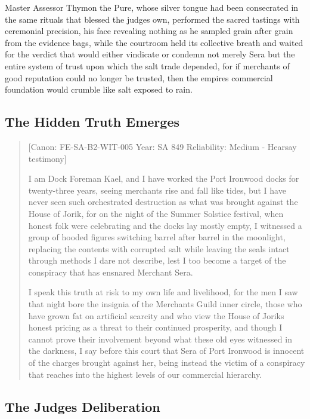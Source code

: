 Master Assessor Thymon the Pure, whose silver tongue had been
consecrated in the same rituals that blessed the judge\textquotesingle s
own, performed the sacred tastings with ceremonial precision, his face
revealing nothing as he sampled grain after grain from the evidence
bags, while the courtroom held its collective breath and waited for the
verdict that would either vindicate or condemn not merely Sera but the
entire system of trust upon which the salt trade depended, for if
merchants of good reputation could no longer be trusted, then the
empire\textquotesingle s commercial foundation would crumble like salt
exposed to rain.

\subsection{The Hidden Truth Emerges}\label{the-hidden-truth-emerges}

\begin{quote}
{[}Canon: FE-SA-B2-WIT-005 \textbar{} Year: SA 849 \textbar{}
Reliability: Medium - Hearsay testimony{]}

I am Dock Foreman Kael, and I have worked the Port Ironwood docks for
twenty-three years, seeing merchants rise and fall like tides, but I
have never seen such orchestrated destruction as what was brought
against the House of Jorik, for on the night of the Summer Solstice
festival, when honest folk were celebrating and the docks lay mostly
empty, I witnessed a group of hooded figures switching barrel after
barrel in the moonlight, replacing the contents with corrupted salt
while leaving the seals intact through methods I dare not describe, lest
I too become a target of the conspiracy that has ensnared Merchant Sera.

I speak this truth at risk to my own life and livelihood, for the men I
saw that night bore the insignia of the Merchant\textquotesingle s Guild
inner circle, those who have grown fat on artificial scarcity and who
view the House of Jorik\textquotesingle s honest pricing as a threat to
their continued prosperity, and though I cannot prove their involvement
beyond what these old eyes witnessed in the darkness, I say before this
court that Sera of Port Ironwood is innocent of the charges brought
against her, being instead the victim of a conspiracy that reaches into
the highest levels of our commercial hierarchy.
\end{quote}

\subsection{The Judge\textquotesingle s
Deliberation}\label{the-judges-deliberation}

